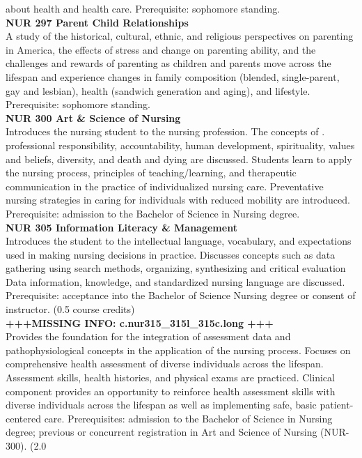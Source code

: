 \documentclass[
  letterpaper,
]{scrbook}
\begin{document}
about health and health care. Prerequisite: sophomore standing.\\
\textbf{NUR 297 Parent Child Relationships}\\
A study of the historical, cultural, ethnic, and religious perspectives
on parenting in America, the effects of stress and change on parenting
ability, and the challenges and rewards of parenting as children and
parents move across the lifespan and experience changes in family
composition (blended, single-parent, gay and lesbian), health (sandwich
generation and aging), and lifestyle. Prerequisite: sophomore
standing.\\
\textbf{NUR 300 Art \& Science of Nursing}\\
Introduces the nursing student to the nursing profession. The concepts
of . professional responsibility, accountability, human development,
spirituality, values and beliefs, diversity, and death and dying are
discussed. Students learn to apply the nursing process, principles of
teaching/learning, and therapeutic communication in the practice of
individualized nursing care. Preventative nursing strategies in caring
for individuals with reduced mobility are introduced. Prerequisite:
admission to the Bachelor of Science in Nursing degree.\\
\textbf{NUR 305 Information Literacy \& Management}\\
Introduces the student to the intellectual language, vocabulary, and
expectations used in making nursing decisions in practice. Discusses
concepts such as data gathering using search methods, organizing,
synthesizing and critical evaluation Data information, knowledge, and
standardized nursing language are discussed. Prerequisite: acceptance
into the Bachelor of Science Nursing degree or consent of instructor.
(0.5 course credits)\\
\textbf{+++MISSING INFO: c.nur315\_315l\_315c.long +++}\\
Provides the foundation for the integration of assessment data and
pathophysiological concepts in the application of the nursing process.
Focuses on comprehensive health assessment of diverse individuals across
the lifespan. Assessment skills, health histories, and physical exams
are practiced. Clinical component provides an opportunity to reinforce
health assessment skills with diverse individuals across the lifespan as
well as implementing safe, basic patient-centered care. Prerequisites:
admission to the Bachelor of Science in Nursing degree; previous or
concurrent registration in Art and Science of Nursing (NUR-300). (2.0
\end{document}
